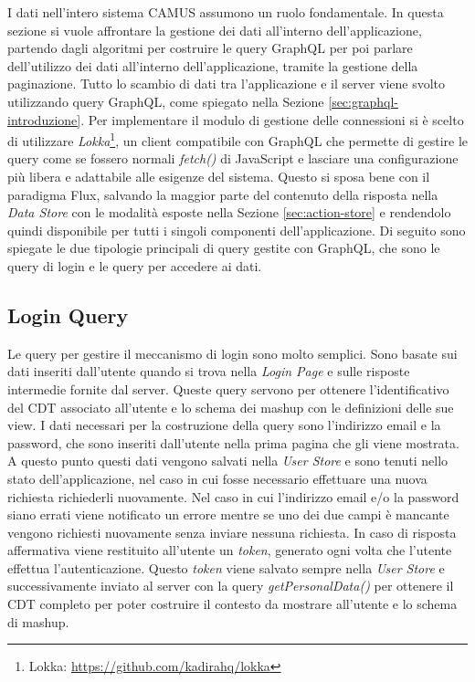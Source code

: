 I dati nell'intero sistema CAMUS assumono un ruolo fondamentale. In questa sezione si vuole affrontare la gestione dei dati all'interno dell'applicazione, partendo dagli algoritmi per costruire le query GraphQL per poi parlare dell'utilizzo dei dati all'interno dell'applicazione, tramite la gestione della paginazione.
Tutto lo scambio di dati tra l'applicazione e il server viene svolto utilizzando query GraphQL, come spiegato nella Sezione \ref{sec:graphql-introduzione}. Per implementare il modulo di gestione delle connessioni si è scelto di utilizzare \emph{Lokka}\footnote{Lokka: \url{https://github.com/kadirahq/lokka}}, un client compatibile con GraphQL che permette di gestire le query come se fossero normali \emph{fetch()} di JavaScript e lasciare una configurazione più libera e adattabile alle esigenze del sistema. Questo si sposa bene con il paradigma Flux, salvando la maggior parte del contenuto della risposta nella \emph{Data Store} con le modalità esposte nella Sezione \ref{sec:action-store} e rendendolo quindi disponibile per tutti i singoli componenti dell'applicazione. Di seguito sono spiegate le due tipologie principali di query gestite con GraphQL, che sono le query di login e le query per accedere ai dati.

\subsection{Login Query}

Le query per gestire il meccanismo di login sono molto semplici. Sono basate sui dati inseriti dall'utente quando si trova nella \emph{Login Page} e sulle risposte intermedie fornite dal server. Queste query servono per ottenere l'identificativo del CDT associato all'utente e lo schema dei mashup con le definizioni delle sue view.
I dati necessari per la costruzione della query sono l'indirizzo email e la password, che sono inseriti dall'utente nella prima pagina che gli viene mostrata. A questo punto questi dati vengono salvati nella \emph{User Store} e sono tenuti nello stato dell'applicazione, nel caso in cui fosse necessario effettuare una nuova richiesta richiederli nuovamente. Nel caso in cui l'indirizzo email e/o la password siano errati viene notificato un errore mentre se uno dei due campi è mancante vengono richiesti nuovamente senza inviare nessuna richiesta.
In caso di risposta affermativa viene restituito all'utente un \emph{token}, generato ogni volta che l'utente effettua l'autenticazione. Questo \emph{token} viene salvato sempre nella \emph{User Store} e successivamente inviato al server con la query \emph{getPersonalData()} per ottenere il CDT completo per poter costruire il contesto da mostrare all'utente e lo schema di mashup.

